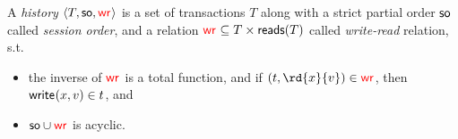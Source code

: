 






\begin{definition}
 A \emph{history} ${\left\langle{T, \mathsf{so}, \textcolor{red}{\mathsf{wr}_{}}}\right\rangle}$ is a set of transactions $T$ along with a strict partial order $\mathsf{so}$ called \emph{session order}, and a 
 relation $\textcolor{red}{\mathsf{wr}_{}}\subseteq T\times \mathsf{reads}({T})$ called \emph{write-read} relation, s.t. 
 \begin{itemize}
  \item the inverse of $\textcolor{red}{\mathsf{wr}_{}}$ is a total function, and if $(\tr,\rd{\xvar}{\val})\in\wro$, then $\textsf{write}_{}({{x}},{{v}})\in{t}$, and
  \item $\mathsf{so}\cup\textcolor{red}{\mathsf{wr}_{}}$ is acyclic.
 \end{itemize}
\end{definition}

